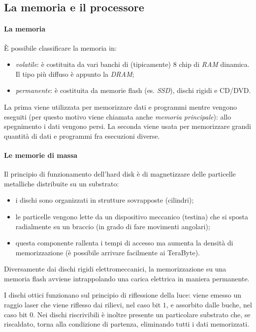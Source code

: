 \subsection{La memoria e il processore}

\paragraph*{La memoria}
\`{E} possibile classificare la memoria in:
\begin{itemize}
	\item \emph{volatile}: è costituita da vari banchi di (tipicamente) \(8\) chip di \emph{RAM} dinamica. Il tipo più diffuso è appunto la \emph{DRAM};
	\item \emph{permanente}: è costituita da memorie flash (es. \emph{SSD}), dischi rigidi e CD/DVD.
\end{itemize}
La prima viene utilizzata per memorizzare dati e programmi mentre vengono eseguiti (per questo motivo viene chiamata anche \emph{memoria principale}): allo spegnimento i dati vengono persi.
La seconda viene usata per memorizzare grandi quantità di dati e programmi fra esecuzioni diverse.

\paragraph{Le memorie di massa}
Il principio di funzionamento dell'hard disk è di magnetizzare delle particelle metalliche distribuite su un substrato:
\begin{itemize}[noitemsep]
	\item i dischi sono organizzati in strutture sovrapposte (cilindri);
	\item le particelle vengono lette da un dispositivo meccanico (testina) che si sposta radialmente su un braccio (in grado di fare movimenti angolari);
	\item questa componente rallenta i tempi di accesso ma aumenta la densità di memorizzazione (è possibile arrivare facilmente ai TeraByte).
\end{itemize}
Diversamente dai dischi rigidi elettromeccanici, la memorizzazione su una memoria flash avviene intrappolando una carica elettrica in maniera permanente.

I dischi ottici funzionano sul principio di riflessione della luce: viene emesso un raggio laser che viene riflesso dai rilievi, nel caso bit \(1\), e assorbito dalle buche, nel caso bit \(0\).
Nei dischi riscrivibili è inoltre presente un particolare substrato che, se riscaldato, torna alla condizione di partenza, eliminando tutti i dati memorizzati.

